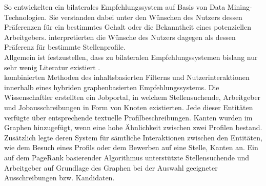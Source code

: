 \newpage
So entwickelten \textcite[S. 1ff.]{applyingDataMining:2014} ein bilaterales Empfehlungssystem auf Basis von Data Mining-Technologien. Sie verstanden dabei unter den Wünschen des Nutzers dessen Präferenzen für ein bestimmtes Gehalt oder die Bekanntheit eines potenziellen Arbeitgebers. \textcite[S. 4ff.]{malinowski:2006} interpretierten die Wünsche des Nutzers dagegen als dessen Präferenz für bestimmte Stellenprofile.\\
Allgemein ist festzustellen, dass zu bilateralen Empfehlungssystemen bislang nur sehr wenig Literatur existiert \cite[S. 2f.]{jobRecommenderSystemsASurvey:2012}.\\

\textcite[S. 1ff.]{lu:2013} kombinierten Methoden des inhaltsbasierten Filterns und Nutzerinteraktionen innerhalb eines hybriden graphenbasierten Empfehlungssystems. Die Wissenschaftler erstellten ein Jobportal, in welchem Stellensuchende, Arbeitgeber und Jobausschreibungen in Form von Knoten existierten. Jede dieser Entitäten verfügte über entsprechende textuelle Profilbeschreibungen. Kanten wurden im Graphen hinzugefügt, wenn eine hohe Ähnlichkeit zwischen zwei Profilen bestand. Zusätzlich legte deren System für sämtliche Interaktionen zwischen den Entitäten, wie dem Besuch eines Profils oder dem Bewerben auf eine Stelle, Kanten an. Ein auf dem PageRank basierender Algorithmus unterstützte Stellensuchende und Arbeitgeber auf Grundlage des Graphen bei der Auswahl geeigneter Ausschreibungen bzw. Kandidaten.
